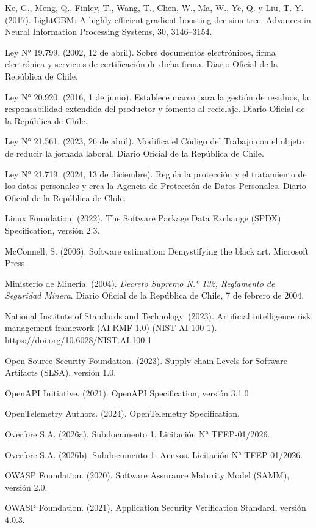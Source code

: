\documentclass[formulario]{../../comun/overfore}
\begin{document}
\begin{referencias}
\item Ke, G., Meng, Q., Finley, T., Wang, T., Chen, W., Ma, W., Ye, Q. y Liu, T.-Y. (2017). LightGBM: A highly efficient gradient boosting decision tree. Advances in Neural Information Processing Systems, 30, 3146–3154.
\item Ley N° 19.799. (2002, 12 de abril). Sobre documentos electrónicos, firma electrónica y servicios de certificación de dicha firma. Diario Oficial de la República de Chile.
\item Ley N° 20.920. (2016, 1 de junio). Establece marco para la gestión de residuos, la responsabilidad extendida del productor y fomento al reciclaje. Diario Oficial de la República de Chile.
\item Ley N° 21.561. (2023, 26 de abril). Modifica el Código del Trabajo con el objeto de reducir la jornada laboral. Diario Oficial de la República de Chile.
\item Ley N° 21.719. (2024, 13 de diciembre). Regula la protección y el tratamiento de los datos personales y crea la Agencia de Protección de Datos Personales. Diario Oficial de la República de Chile.
\item Linux Foundation. (2022). The Software Package Data Exchange (SPDX) Specification, versión 2.3.
\item McConnell, S. (2006). Software estimation: Demystifying the black art. Microsoft Press.
\item Ministerio de Minería. (2004). \emph{Decreto Supremo N.º 132, Reglamento de Seguridad Minera}. Diario Oficial de la República de Chile, 7 de febrero de 2004.
\item National Institute of Standards and Technology. (2023). Artificial intelligence risk management framework (AI RMF 1.0) (NIST AI 100-1). https://doi.org/10.6028/NIST.AI.100-1
\item Open Source Security Foundation. (2023). Supply-chain Levels for Software Artifacts (SLSA), versión 1.0.
\item OpenAPI Initiative. (2021). OpenAPI Specification, versión 3.1.0.
\item OpenTelemetry Authors. (2024). OpenTelemetry Specification.
\item Overfore S.A. (2026a). Subdocumento 1. Licitación N° TFEP-01/2026.
\item Overfore S.A. (2026b). Subdocumento 1: Anexos. Licitación N° TFEP-01/2026.
\item OWASP Foundation. (2020). Software Assurance Maturity Model (SAMM), versión 2.0.
\item OWASP Foundation. (2021). Application Security Verification Standard, versión 4.0.3.

\end{referencias}
\end{document}
